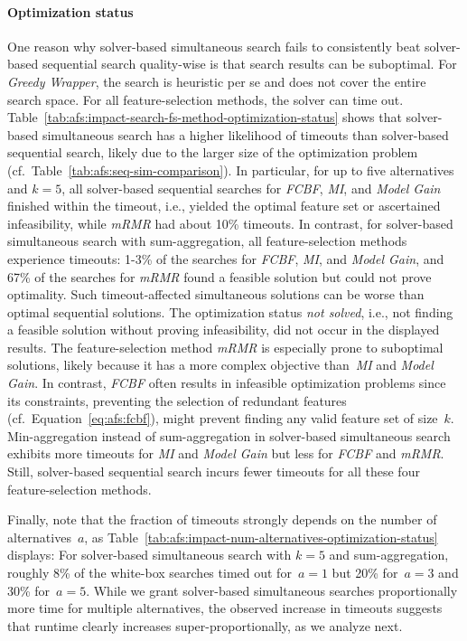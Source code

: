 \documentclass{article}
\theoremstyle{definition}
\begin{document}
\paragraph{Optimization status}

One reason why solver-based simultaneous search fails to consistently beat solver-based sequential search quality-wise is that search results can be suboptimal.
For \emph{Greedy Wrapper}, the search is heuristic per se and does not cover the entire search space.
For all feature-selection methods, the solver can time out.
Table~\ref{tab:afs:impact-search-fs-method-optimization-status} shows that solver-based simultaneous search has a higher likelihood of timeouts than solver-based sequential search, likely due to the larger size of the optimization problem (cf.~Table~\ref{tab:afs:seq-sim-comparison}).
In particular, for up to five alternatives and $k=5$, all solver-based sequential searches for \emph{FCBF}, \emph{MI}, and \emph{Model Gain} finished within the timeout, i.e., yielded the optimal feature set or ascertained infeasibility, while \emph{mRMR} had about 10\% timeouts.
In contrast, for solver-based simultaneous search with sum-aggregation, all feature-selection methods experience timeouts:
1-3\% of the searches for \emph{FCBF}, \emph{MI}, and \emph{Model Gain}, and 67\% of the searches for \emph{mRMR} found a feasible solution but could not prove optimality.
Such timeout-affected simultaneous solutions can be worse than optimal sequential solutions.
The optimization status \emph{not solved}, i.e., not finding a feasible solution without proving infeasibility, did not occur in the displayed results.
The feature-selection method \emph{mRMR} is especially prone to suboptimal solutions, likely because it has a more complex objective than~\emph{MI} and \emph{Model Gain}.
In contrast, \emph{FCBF} often results in infeasible optimization problems since its constraints, preventing the selection of redundant features (cf.~Equation~\ref{eq:afs:fcbf}), might prevent finding any valid feature set of size~$k$.
Min-aggregation instead of sum-aggregation in solver-based simultaneous search exhibits more timeouts for \emph{MI} and \emph{Model Gain} but less for \emph{FCBF} and \emph{mRMR}.
Still, solver-based sequential search incurs fewer timeouts for all these four feature-selection methods.

Finally, note that the fraction of timeouts strongly depends on the number of alternatives~$a$, as Table~\ref{tab:afs:impact-num-alternatives-optimization-status} displays:
For solver-based simultaneous search with $k=5$ and sum-aggregation, roughly 8\% of the white-box searches timed out for~$a=1$ but 20\% for~$a=3$ and 30\% for~$a=5$.
While we grant solver-based simultaneous searches proportionally more time for multiple alternatives, the observed increase in timeouts suggests that runtime clearly increases super-proportionally, as we analyze next.
\end{document}
